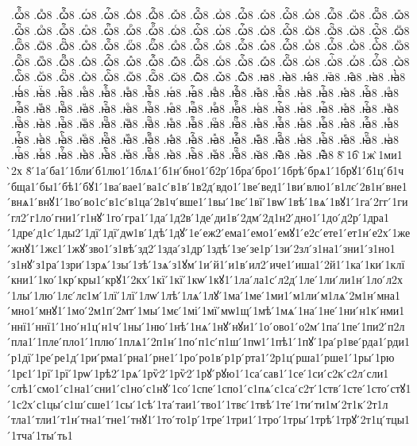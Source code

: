 {.ꙍⷠ҇8
.ꙍⷡ8
.ꙍⷡ҇8
.ꙍⷢ8
.ꙍⷢ҇8
.ꙍⷣ8
.ꙍⷣ҇8
.ꙍⷤ8
.ꙍⷤ҇8
.ꙍⷥ8
.ꙍⷥ҇8
.ꙍⷦ8
.ꙍⷦ҇8
.ꙍⷧ8
.ꙍⷧ҇8
.ꙍⷨ8
.ꙍⷨ҇8
.ꙍⷩ8
.ꙍⷩ҇8
.ꙍⷪ8
.ꙍⷪ҇8
.ꙍⷫ8
.ꙍⷫ҇8
.ꙍⷬ8
.ꙍⷬ҇8
.ꙍⷭ8
.ꙍⷭ҇8
.ꙍⷮ8
.ꙍⷮ҇8
.ꙍⷯ8
.ꙍⷯ҇8
.ꙍⷰ8
.ꙍⷰ҇8
.ꙍⷱ8
.ꙍⷱ҇8
.ꙍⷲ8
.ꙍⷲ҇8
.ꙍⷳ8
.ꙍⷳ҇8
.ꙍⷴ8
.ꙍⷴ҇8
.ꙍⷵ8
.ꙍⷵ҇8
.ꙍⷶ8
.ꙍⷶ҇8
.ꙍⷷ8
.ꙍⷷ҇8
.ꙍⷸ8
.ꙍⷸ҇8
.ꙍⷹ8
.ꙍⷹ҇8
.ꙍⷺ8
.ꙍⷺ҇8
.ꙍⷻ8
.ꙍⷻ҇8
.ꙍⷼ8
.ꙍⷼ҇8
.ꙍⷽ8
.ꙍⷽ҇8
.ꙍⷾ8
.ꙍⷾ҇8
.ꙍⷿ8
.ꙍⷿ҇8
.ꙍꙴ8
.ꙍꙴ҇8
.ꙍꙵ8
.ꙍꙵ҇8
.ꙍꙶ8
.ꙍꙶ҇8
.ꙍꙷ8
.ꙍꙷ҇8
.ꙍꙸ8
.ꙍꙸ҇8
.ꙍꙹ8
.ꙍꙹ҇8
.ꙍꙺ8
.ꙍꙺ҇8
.ꙍꙻ8
.ꙍꙻ҇8
.ꙍ꙼8
.ꙍ꙼҇8
.ꙍ꙽8
.ꙍ꙽҇8
.ꙗ8
.ꙗ̀8
.ꙗ́8
.ꙗ̈8
.ꙗ̑8
.ꙗ҆8
.ꙗ҆̀8
.ꙗ҆́8
.ꙗ҆̈8
.ꙗ҆̑8
.ꙗⷠ8
.ꙗⷠ҇8
.ꙗⷡ8
.ꙗⷡ҇8
.ꙗⷢ8
.ꙗⷢ҇8
.ꙗⷣ8
.ꙗⷣ҇8
.ꙗⷤ8
.ꙗⷤ҇8
.ꙗⷥ8
.ꙗⷥ҇8
.ꙗⷦ8
.ꙗⷦ҇8
.ꙗⷧ8
.ꙗⷧ҇8
.ꙗⷨ8
.ꙗⷨ҇8
.ꙗⷩ8
.ꙗⷩ҇8
.ꙗⷪ8
.ꙗⷪ҇8
.ꙗⷫ8
.ꙗⷫ҇8
.ꙗⷬ8
.ꙗⷬ҇8
.ꙗⷭ8
.ꙗⷭ҇8
.ꙗⷮ8
.ꙗⷮ҇8
.ꙗⷯ8
.ꙗⷯ҇8
.ꙗⷰ8
.ꙗⷰ҇8
.ꙗⷱ8
.ꙗⷱ҇8
.ꙗⷲ8
.ꙗⷲ҇8
.ꙗⷳ8
.ꙗⷳ҇8
.ꙗⷴ8
.ꙗⷴ҇8
.ꙗⷵ8
.ꙗⷵ҇8
.ꙗⷶ8
.ꙗⷶ҇8
.ꙗⷷ8
.ꙗⷷ҇8
.ꙗⷸ8
.ꙗⷸ҇8
.ꙗⷹ8
.ꙗⷹ҇8
.ꙗⷺ8
.ꙗⷺ҇8
.ꙗⷻ8
.ꙗⷻ҇8
.ꙗⷼ8
.ꙗⷼ҇8
.ꙗⷽ8
.ꙗⷽ҇8
.ꙗⷾ8
.ꙗⷾ҇8
.ꙗⷿ8
.ꙗⷿ҇8
.ꙗꙴ8
.ꙗꙴ҇8
.ꙗꙵ8
.ꙗꙵ҇8
.ꙗꙶ8
.ꙗꙶ҇8
.ꙗꙷ8
.ꙗꙷ҇8
.ꙗꙸ8
.ꙗꙸ҇8
.ꙗꙹ8
.ꙗꙹ҇8
.ꙗꙺ8
.ꙗꙺ҇8
.ꙗꙻ8
.ꙗꙻ҇8
.ꙗ꙼8
.ꙗ꙼҇8
.ꙗ꙽8
.ꙗ꙽҇8
8̀
̀1б
̀1ж
̀1ми1
̀2х
8́
́1а
́ба1
́1бли
́б1лю1
́1блѧ1
́б1н
́бно1
́б2р
́1бра
́бро1
́1брѣ
́брѧ1
́1брꙋ1
́б1ц
́б1ч
́бща1
́бы1
́бѣ1
́бꙋ1
́1ва
́вае1
́ва1с
́в1в
́1в2д
́вдо1
́1ве
́вед1
́1ви
́влю1
́в1лє
́2в1н
́вне1
́внѧ1
́внꙋ1
́1во
́во1с
́в1с
́в1ца
́2в1ч
́вше1
́1вы
́1вє
́1вї
́1вѡ
́1вѣ
́1вѧ
́1вꙋ1
́1га
́2гг
́1ги
́гл2
́г1ло
́гни1
́г1нꙋ
́1го
́гра1
́1да
́1д2в
́1де
́ди1в
́2дм
́2д1н2
́дно1
́1до
́д2р
́1дра1
́1дре
́д1с
́1ды2
́1дї
́1дї
́дѡ1в
́1дѣ
́1дꙋ
́1е
́еж2
́ема1
́емо1
́емꙋ1
́е2с
́ете1
́ет1н
́е2х
́1же
́жнꙋ1
́1жє1
́1жꙋ
́зво1
́з1вѣ
́зд2
́1зда
́з1др
́1здѣ
́1зе
́зе1р
́1зи
́2зл
́з1на1
́зни1
́з1но1
́з1нꙋ
́з1ра
́1зри
́1зрѧ
́1зы
́1зѣ
́1зѧ
́з1ꙋм
́1и
́й1
́и1в
́ил2
́иче1
́иша1
́2й1
́1ка
́1ки
́1клї
́кни1
́1ко
́1кр
́кры1
́крꙋ1
́2кх
́1кї
́1кї
́1кѡ
́1кꙋ1
́1ла
́ла1с
́л2д
́1ле
́1ли
́ли1н
́1ло
́л2х
́1лы
́1лю
́1лє
́лє1м
́1лї
́1лї
́1лѡ
́1лѣ
́1лѧ
́1лꙋ
́1ма
́1ме
́1ми1
́м1ли
́м1лѧ
́2м1н
́мна1
́мно1
́мнꙋ1
́1мо
́2м1п
́2мт
́1мы
́1мє
́1мі
́1мї
́мѡ1щ
́1мѣ
́1мѧ
́1на
́1не
́1ни
́н1к
́нми1
́ннї1
́ннї1
́1но
́н1ц
́н1ч
́1ны
́1ню
́1нѣ
́1нѧ
́1нꙋ
́нꙋи1
́1о
́ово1
́о2м
́1па
́1пе
́1пи2
́п2л
́пла1
́1пле
́пло1
́1плю
́1плѧ1
́2п1н
́1по
́п1с
́п1ш
́1пѡ1
́1пѣ1
́1пꙋ
́1ра
́р1ве
́рда1
́рди1
́р1дї
́1ре
́ре1д
́1ри
́рма1
́рна1
́рне1
́1ро
́ро1в
́р1р
́рта1
́2р1ц
́рша1
́рше1
́1ры
́1рю
́1рє1
́1рї
́1рї
́1рѡ
́1рѣ2
́1рѧ
́1рѷ2
́1рѷ2
́1рꙋ
́рꙋю1
́1са
́сав1
́1се
́1си
́с2к
́с2л
́сли1
́слѣ1
́смо1
́с1на1
́сни1
́с1но
́с1нꙋ
́1со
́1спе
́1спо1
́с1пѧ
́с1са
́с2т
́1ств
́1сте
́1сто
́стꙋ1
́1с2х
́с1цы
́с1ш
́сше1
́1сы
́1сѣ
́1та
́таи1
́тво1
́1твє
́1твѣ
́1те
́1ти
́ти1м
́2т1к
́2т1л
́тла1
́тли1
́т1н
́тна1
́тне1
́тнꙋ1
́1то
́то1р
́1тре
́1три1
́1тро
́1тры
́1трѣ
́1трꙋ
́2т1ц
́тцы1
́1тча
́1ты
́ть1
}
